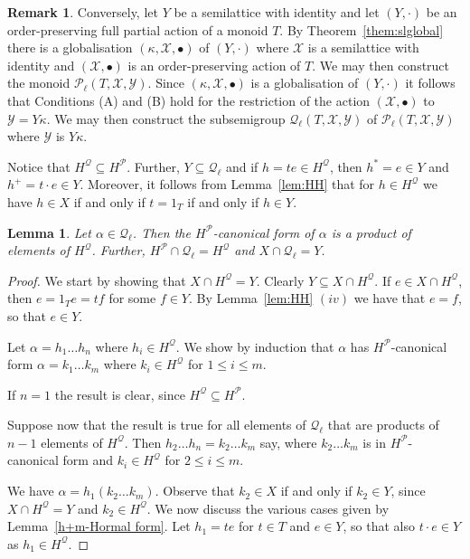 \documentclass[12pt]{amsart}
\newtheorem{lem}[them]{Lemma}
\theoremstyle{definition}
\newtheorem{rem}[them]{Remark}
\theoremstyle{definition}
\numberwithin{them}{section}
\numberwithin{equation}{section}
\newcommand{\QQ}{\mbox{$\mathcal{Q}_\ell$}}
\newcommand{\X}{\mathcal{X}}
\newcommand{\Y}{\mathcal{Y}}
\begin{document}
{{\begin{rem}
Conversely, let $Y$ be a semilattice with identity and let $(Y, \cdot)$ be an order-preserving full partial action of a monoid $T$. By Theorem~\ref{them:slglobal} there is a globalisation $(\kappa,\X,\bullet)$ of $(Y, \cdot)$ where $\X$ is a semilattice with identity and $(\X,\bullet)$ is an order-preserving action of $T$.  We may then construct the  monoid $\mathcal{P}_\ell(T,\X,\Y)$. Since $(\kappa,\X,\bullet)$ is a globalisation of $(Y,\cdot)$ it follows that Conditions (A) and (B) hold for the restriction of the action $(\X,\bullet)$ to $\Y=Y\kappa$. We may then construct the subsemigroup $\QQ(T,\X,\Y)$ of $\mathcal{P}_\ell(T,\X,\Y)$ where $\Y$ is $Y\kappa$. 
\end{rem}


Notice that $H^{\mathcal{Q}}\subseteq H^{\mathcal{P}}$. Further, $Y\subseteq \QQ$ and if $h=te\in H^{\mathcal{Q}}$, then 
$h^*=e\in Y$ and $h^+=t\cdot e\in Y$. Moreover, it follows from Lemma~\ref{lem:HH} that  for $h\in H^{\mathcal{Q}}$ we have  $h\in X$ if and only if $t=1_T$ if and only if $h\in Y$.

\begin{lem}\label{lem:lucky} Let $\alpha\in \QQ$. Then 
the $H^{\mathcal{P}}$-canonical form of $\alpha$ is a product of elements of $H^{\mathcal{Q}}$. Further,
$H^{\mathcal{P}}\cap \QQ=H^{\mathcal{Q}}$ and $X\cap \QQ=Y$. 
\end{lem}
\begin{proof}

We start by showing that $X\cap H^{\mathcal{Q}}=Y$. Clearly $Y\subseteq X\cap H^{\mathcal{Q}}$. 
If $e\in  X\cap H^{\mathcal{Q}}$, then $e=1_Te=tf$ for some $f\in Y$. By 
Lemma~\ref{lem:HH} $(iv)$ we have that $e=f$, so that 
  $e\in Y$.

Let $\alpha=h_1\dots h_n$ where $h_i\in H^{\mathcal{Q}}$. We show by induction that $\alpha$ has $H^{\mathcal{P}}$-canonical form $\alpha=k_1\dots k_m$
where $k_i\in H^{\mathcal{Q}}$ for $1\leq i\leq m$.

If $n=1$ the result is clear, since $H^{\mathcal{Q}}\subseteq H^{\mathcal{P}}$. 

Suppose now that the result is true for all elements of $\QQ$ that are products of $n-1$ elements of $H^{\mathcal{Q}}$. Then
$h_2\dots h_n=k_2\dots k_m$ say, where $k_2\dots k_m$
is in $H^{\mathcal{P}}$-canonical form and $k_i\in H^{\mathcal{Q}}$ for $2\leq i\leq m$. 

We have  $\alpha=h_1(k_2\dots k_m)$.
 Observe that  $k_2\in X$ if and only if $k_2\in Y$, since $X\cap H^{\mathcal{Q}}=Y$ and $k_2\in H^{\mathcal{Q}}$.
 We now discuss the various cases given by  Lemma~\ref{h+m-Hormal form}. Let $h_1=te$ for $t\in T$ and $e\in Y$, so that also $t\cdot e\in Y$ as $h_1\in H^{\mathcal{Q}}$. 
 


\end{proof}}}
\end{document}
